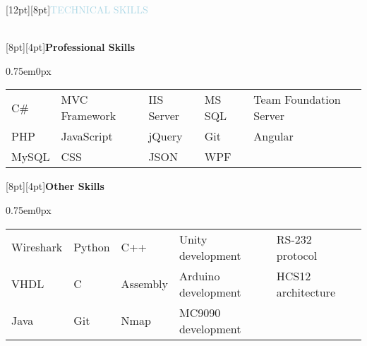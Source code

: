 \documentclass{res}
\newenvironment{ResumeBlock}[1]
{
	\begin{normalsize}
		\raisebox{0pt}[12pt][8pt]{\textcolor{lightblue}{#1}}
	\end{normalsize}
	\\
}
{	
}
\newenvironment{DetailsBlockNoSubheader}[1]
{
	\raisebox{0pt}[8pt][4pt]{\textbf{\color{darkfont}#1}}
	\begin{adjustwidth}{0.75em}{0px}
	}
	{	
	\end{adjustwidth}
}
\begin{document}
	\begin{ResumeBlock}{TECHNICAL SKILLS}		
		\begin{DetailsBlockNoSubheader}{Professional Skills}
			\begin{tabular}{ l l l l l }
				C\# & MVC Framework & IIS Server & MS SQL & Team Foundation Server \\ 
				PHP & JavaScript & jQuery & Git & Angular \\
				MySQL & CSS & JSON & WPF \\
			\end{tabular}
		\end{DetailsBlockNoSubheader}
		\begin{DetailsBlockNoSubheader}{Other Skills}	
			\begin{tabular}{ l l l l l }
				Wireshark & Python & C++ & Unity development & RS-232 protocol \\ 
				VHDL & C & Assembly & Arduino development & HCS12 architecture \\ 
				Java & Git & Nmap & MC9090 development \\
			\end{tabular}
		\end{DetailsBlockNoSubheader}
	\end{ResumeBlock}
\end{document}
